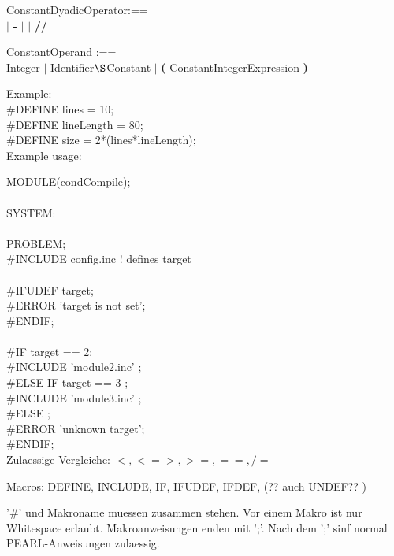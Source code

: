 ConstantDyadicOperator:== \\
\x {\bf +} $\mid$ {\bf -} $\mid$ {\bf *} $\mid$ {\bf // }

ConstantOperand :== \\
\x Integer $\mid$ Identifier$\S $Constant $\mid$ 
{\bf (} ConstantIntegerExpression {\bf )}

Example:\\
\#DEFINE lines = 10;			\\
\#DEFINE lineLength = 80;		\\
\#DEFINE size = 2*(lines*lineLength);	\\

Example usage:

MODULE(condCompile);\\
\\
SYSTEM:\\
\ \\
PROBLEM;\\
\#INCLUDE config.inc    ! defines target\\
\ \\
\#IFUDEF target;\\
\x \#ERROR 'target is not set';\\
\#ENDIF;\\
\\
\#IF target == 2;\\
\x  \#INCLUDE 'module2.inc' ;\\
\#ELSE IF target == 3 ;\\
\x   \#INCLUDE 'module3.inc' ;\\
\#ELSE ;\\
\x   \#ERROR 'unknown target';\\
\#ENDIF;\\

Zulaessige Vergleiche: $<, <= >, >=, ==, /= $

Macros: DEFINE, INCLUDE, IF, IFUDEF, IFDEF, (?? auch UNDEF?? )

'\#' und Makroname muessen zusammen stehen. Vor einem Makro ist nur Whitespace erlaubt. Makroanweisungen enden mit ';'.
Nach dem ';' sinf normal PEARL-Anweisungen zulaessig.
